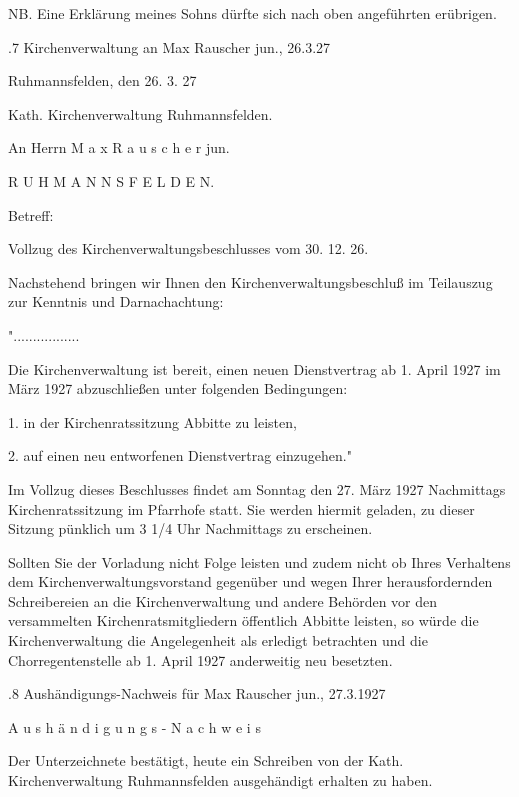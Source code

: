 \documentclass[12pt,a4paper]{book}
\begin{document}
NB. Eine Erklärung meines Sohns dürfte sich nach oben angeführten erübrigen.

.7 Kirchenverwaltung an Max Rauscher jun., 26.3.27

Ruhmannsfelden, den 26. 3. 27

Kath. Kirchenverwaltung Ruhmannsfelden.



An Herrn   M a x   R a u s c h e r   jun.



R U H M A N N S F E L D E N.



Betreff:



Vollzug des Kirchenverwaltungsbeschlusses vom 30. 12. 26.



Nachstehend bringen wir Ihnen den Kirchenverwaltungsbeschluß im Teilauszug zur
Kenntnis und Darnachachtung:



".................

Die Kirchenverwaltung ist bereit, einen neuen Dienstvertrag ab 1. April 1927 im
März 1927 abzuschließen unter folgenden Bedingungen:

1. in der Kirchenratssitzung Abbitte zu leisten,

2. auf einen neu entworfenen Dienstvertrag einzugehen."

Im Vollzug dieses Beschlusses findet am Sonntag den 27. März 1927 Nachmittags
Kirchenratssitzung im Pfarrhofe statt. Sie werden hiermit geladen, zu dieser
Sitzung pünklich um 3 1/4 Uhr Nachmittags zu erscheinen.

Sollten Sie der Vorladung nicht Folge leisten und zudem nicht ob Ihres
Verhaltens dem Kirchenverwaltungsvorstand gegenüber und wegen Ihrer
herausfordernden Schreibereien an die Kirchenverwaltung und andere Behörden vor
den versammelten Kirchenratsmitgliedern öffentlich Abbitte leisten, so würde die
Kirchenverwaltung die Angelegenheit als erledigt betrachten und die
Chorregentenstelle ab 1. April 1927 anderweitig neu besetzten.



.8 Aushändigungs-Nachweis für Max Rauscher jun., 27.3.1927

A u s h ä n d i g u n g s - N a c h w e i s



Der Unterzeichnete bestätigt, heute ein Schreiben von der Kath.
Kirchenverwaltung Ruhmannsfelden ausgehändigt erhalten zu haben.
\end{document}
